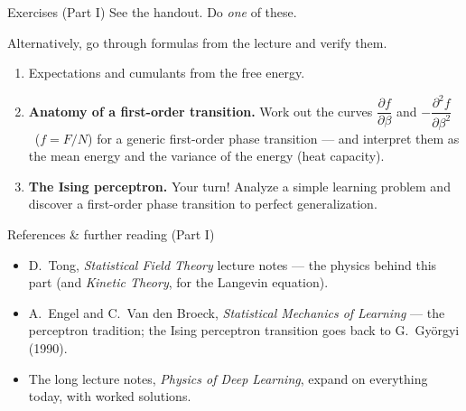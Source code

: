 \documentclass[11pt]{beamer}
\newcommand{\pd}{\partial}
\begin{document}
\begin{frame}{Exercises (Part I)}
  See the handout. Do \emph{one} of these.
  
  Alternatively, go through formulas from the lecture and verify them.
  
  \vspace{3mm}
  \begin{enumerate}
    \item[0.] Expectations and cumulants from the free energy.
    \item[1.] \textbf{Anatomy of a first-order transition.} Work out the
      curves $\dfrac{\pd f}{\pd\beta}$ and $-\dfrac{\pd^2 f}{\pd\beta^2}$
      \ ($f = F/N$) for a generic first-order phase transition ---
      and interpret them as the mean energy and the variance of the
      energy (heat capacity).
      \vspace{2mm}
    \item[2.] \textbf{The Ising perceptron.} Your turn! Analyze a simple learning problem and discover a first-order phase transition to perfect generalization.
  \end{enumerate}
  \vspace{4mm}
  \begin{center}
  \end{center}
\end{frame}

\begin{frame}{References \& further reading (Part I)}
  \small
  \begin{itemize}
    \item D.~Tong, \emph{Statistical Field Theory} lecture notes ---
      the physics behind this part (and \emph{Kinetic Theory}, for the
      Langevin equation).
    \item A.~Engel and C.~Van den Broeck, \emph{Statistical Mechanics of
      Learning} --- the perceptron tradition; the Ising perceptron
      transition goes back to G.~Gy\"orgyi (1990).
    \item The long lecture notes, \emph{Physics of Deep Learning},
      expand on everything today, with worked solutions.
  \end{itemize}
\end{frame}
\end{document}
